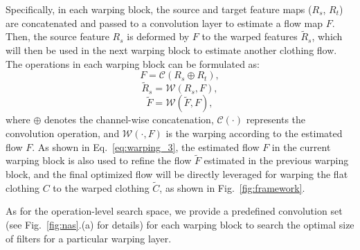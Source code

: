\documentclass[sigconf]{acmart}
\newcommand*\chancery{\fontfamily{pzc}\selectfont}
\begin{document}
Specifically, in each warping block, the source and target feature maps ($R_s$, $R_t$) are concatenated and passed to a convolution layer to estimate a flow map $F$. Then, the source feature $R_s$ is deformed by $F$ to the warped features $\widetilde{R}_s$, which will then be used in the next warping block to estimate another clothing flow. The operations in each warping block can be formulated as:
\begin{equation}
F = \mathcal{C}(R_s \oplus R_t),
\label{eq:warping_1}
\end{equation}
\begin{equation}
\widetilde{R}_s = \mathcal{W}(R_s,F),
\label{eq:warping_2}
\end{equation}
\begin{equation}
\widetilde{F} = \mathcal{W}(\widetilde{F},F),
\label{eq:warping_3}
\end{equation}
where $\oplus$ denotes the channel-wise concatenation, $\mathcal{C}(\cdot)$ represents the convolution operation, and $\mathcal{W}(\cdot,F)$ is the warping according to the estimated flow $F$. As shown in Eq.~\ref{eq:warping_3}, the estimated flow $F$ in the current warping block is also used to refine the flow $\widetilde{F}$ estimated in the previous warping block, and the final optimized flow will be directly leveraged for warping the flat clothing $C$ to the warped clothing $\widetilde{C}$, as shown in Fig.~\ref{fig:framework}. 

As for the operation-level search space\underline{\chancery{O}}, we provide a predefined convolution set (see Fig.~\ref{fig:nas}.(a) for details) for each warping block to search the optimal size of filters for a particular warping layer.
\end{document}
